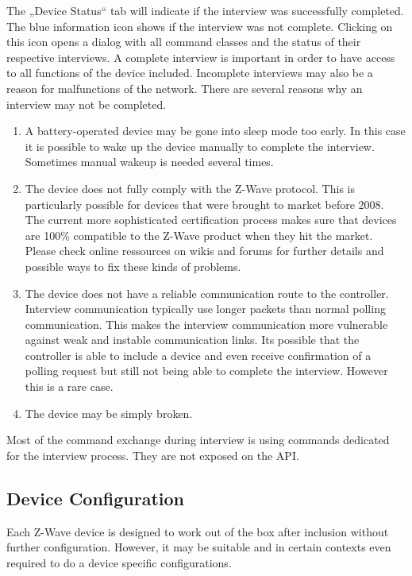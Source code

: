 The „Device Status“ tab will indicate if the interview was successfully completed.  The blue information icon shows if the interview was not complete. Clicking on this icon opens a dialog with all command classes and the status of their respective interviews.  
A complete interview is important in order to have access to all functions of the device included. Incomplete interviews may also be a reason for malfunctions of the network.
There are several reasons why an interview may not be completed.
\begin{enumerate}
\item A battery-operated device may be gone into sleep mode too early. In this case it is possible to wake up the device manually to complete the interview. Sometimes manual wakeup is needed several times.
\item The device does not fully comply with the Z-Wave protocol. This is particularly possible for devices that were brought to market before 2008. 
The current more sophisticated certification process makes sure that devices are 100\% compatible to the Z-Wave product when they hit the market. 
Please check online ressources on wikis and forums for further details and possible ways to fix these kinds of problems.
\item The device does not have a reliable communication route to the controller. Interview communication typically use longer packets than normal polling communication. This makes the interview communication more vulnerable against weak and instable communication links. Its possible that the controller is able to include a device and even receive confirmation of a polling request but still not being able to complete the interview. However this is a rare case.
\item The device may be simply broken.

\end{enumerate}

Most of the command exchange during interview is using commands dedicated for the interview process. They are not exposed on the API.

\subsection{Device Configuration} 


Each Z-Wave device is designed to work out of the box after inclusion without further configuration. 
However, it may be suitable and in certain contexts even required to do a device specific configurations.

